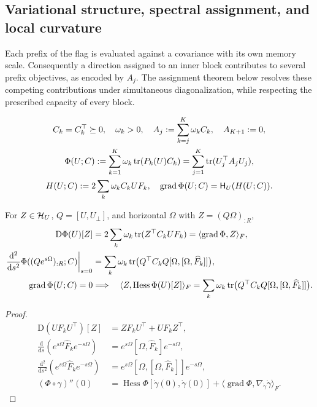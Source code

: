 \subsection{Variational structure, spectral assignment, and local curvature}
Each prefix of the flag is evaluated against a covariance with its own memory
scale. Consequently a direction assigned to an inner block contributes to
several prefix objectives, as encoded by $A_j$. The assignment theorem below
resolves these competing contributions under simultaneous diagonalization,
while respecting the prescribed capacity of every block.

\begin{definition}
\begin{gather}
 C_k=C_k^\top\succeq0,\quad \omega_k>0,\quad
 A_j:=\sum_{k=j}^K\omega_k C_k,\quad A_{K+1}:=0,\\
 \Phi(U;C):=\sum_{k=1}^K\omega_k\operatorname{tr}(P_k(U)C_k)
 =\sum_{j=1}^K\operatorname{tr}(U_j^\top A_jU_j),
 \label{eq:tf-objective}\\
 H(U;C):=2\sum_k\omega_k C_kUF_k,\quad
 \operatorname{grad}\Phi(U;C)=\mathsf H_U(H(U;C)).
\end{gather}
\end{definition}
\begin{proposition}\label{prop:rigid-variation}
For $Z\in\mathcal H_U$, $Q=[U,U_\perp]$, and horizontal $\Omega$ with
$Z=(Q\Omega)_{:R}$,
\begin{align}
 \mathrm D\Phi(U)[Z]&=2\sum_k\omega_k\operatorname{tr}(Z^\top C_kUF_k)
 =\langle\operatorname{grad}\Phi,Z\rangle_F,\\
 \left.\frac{\mathrm d^2}{\mathrm ds^2}\Phi((Qe^{s\Omega})_{:R};C)\right|_{s=0}
 &=\sum_k\omega_k\operatorname{tr}\bigl(Q^\top C_kQ[\Omega,[\Omega,\widehat F_k]]\bigr),\\
 \operatorname{grad}\Phi(U;C)=0
 &\Longrightarrow\quad
 \langle Z,\operatorname{Hess}\Phi(U)[Z]\rangle_F
 =\sum_k\omega_k\operatorname{tr}\bigl(Q^\top C_kQ[\Omega,[\Omega,\widehat F_k]]\bigr).
\end{align}
\end{proposition}
\begin{proof}
\begin{align}
 \mathrm D(UF_kU^\top)[Z]&=ZF_kU^\top+UF_kZ^\top,\\
 \frac{\mathrm d}{\mathrm ds}(e^{s\Omega}\widehat F_ke^{-s\Omega})
 &=e^{s\Omega}[\Omega,\widehat F_k]e^{-s\Omega},\\
 \frac{\mathrm d^2}{\mathrm ds^2}(e^{s\Omega}\widehat F_ke^{-s\Omega})
 &=e^{s\Omega}[\Omega,[\Omega,\widehat F_k]]e^{-s\Omega},\\
 (\Phi\circ\gamma)''(0)
 &=\operatorname{Hess}\Phi[\dot\gamma(0),\dot\gamma(0)]
   +\langle\operatorname{grad}\Phi,\nabla_{\dot\gamma}\dot\gamma\rangle_F.
\end{align}
\end{proof}
